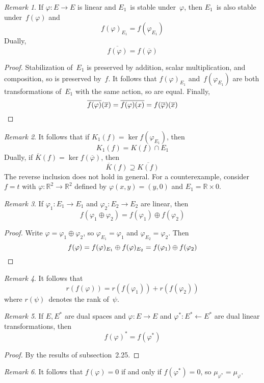 \documentclass[letterpaper,12pt]{article}
\newcommand{\R}{\mathbb{R}}
\newcommand{\from}{\leftarrow}
\newcommand{\sect}{\cap}
\newcommand{\dsum}{\oplus}
\newcommand{\proj}[1]{\overline{#1}}
\theoremstyle{definition}
\theoremstyle{remark}
\newtheorem*{rmk}{Remark}
\begin{document}
\begin{rmk}
If \(\varphi:E\to E\) is linear and \(E_1\)~is stable under~\(\varphi\), then \(E_1\)~is also stable under~\(f(\varphi)\) and
\[f(\varphi)_{E_1}=f(\varphi_{E_1})\]
Dually,
\[\proj{f(\varphi)}=f(\proj{\varphi})\]
\end{rmk}
\begin{proof}
Stabilization of~\(E_1\) is preserved by addition, scalar multiplication, and composition, so is preserved by~\(f\). It follows that \(f(\varphi)_{E_1}\) and~\(f(\varphi_{E_1})\) are both transformations of~\(E_1\) with the same action, so are equal. Finally,
\[\proj{f(\varphi)}(\proj{x})=\proj{f(\varphi)(x)}=f(\proj{\varphi})(\proj{x})\qedhere\]
\end{proof}

\begin{rmk}
It follows that if \(K_1(f)=\ker f(\varphi_{E_1})\), then
\[K_1(f)=K(f)\sect E_1\]
Dually, if \(\proj{K}(f)=\ker f(\proj{\varphi})\), then
\[\proj{K}(f)\supseteq\proj{K(f)}\]
The reverse inclusion does not hold in general. For a counterexample, consider \(f=t\) with \(\varphi:\R^2\to\R^2\) defined by \(\varphi(x,y)=(y,0)\) and \(E_1=\R\times 0\).
\end{rmk}

\begin{rmk}
If \(\varphi_1:E_1\to E_1\) and \(\varphi_2:E_2\to E_2\) are linear, then
\[f(\varphi_1\dsum\varphi_2)=f(\varphi_1)\dsum f(\varphi_2)\]
\end{rmk}
\begin{proof}
Write \(\varphi=\varphi_1\dsum\varphi_2\), so \(\varphi_{E_1}=\varphi_1\) and \(\varphi_{E_2}=\varphi_2\). Then
\[f(\varphi)=f(\varphi)_{E_1}\dsum f(\varphi)_{E_2}=f(\varphi_1)\dsum f(\varphi_2)\qedhere\]
\end{proof}

\begin{rmk}
It follows that
\[r(f(\varphi))=r(f(\varphi_1))+r(f(\varphi_2))\]
where \(r(\psi)\)~denotes the rank of~\(\psi\).
\end{rmk}

\begin{rmk}
If \(E,E^*\) are dual spaces and \(\varphi:E\to E\) and \(\varphi^*:E^*\from E^*\) are dual linear transformations, then
\[f(\varphi)^*=f(\varphi^*)\]
\end{rmk}
\begin{proof}
By the results of subsection~2.25.
\end{proof}

\begin{rmk}
It follows that \(f(\varphi)=0\) if and only if \(f(\varphi^*)=0\), so \(\mu_{\varphi^*}=\mu_{\varphi}\).
\end{rmk}
\end{document}
